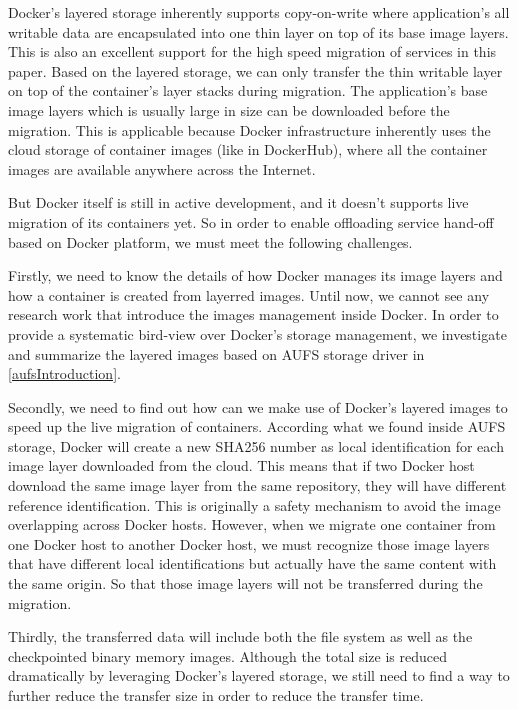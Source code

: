 Docker's layered storage inherently supports copy-on-write where application's all writable data are encapsulated into one thin layer on top of its base image layers. This is also an excellent support for the high speed migration of services in this paper. Based on the layered storage, we can only transfer the thin writable layer on top of the container's layer stacks during migration. The application's base image layers which is usually large in size can be downloaded before the migration. This is applicable because Docker infrastructure inherently uses the cloud storage of container images (like in DockerHub), where all the container images are available anywhere across the Internet. 

But Docker itself is still in active development, and it doesn't supports live migration of its containers yet. So in order to enable offloading service hand-off based on Docker platform, we must meet the following challenges.

Firstly, we need to know the details of how Docker manages its image layers and how a container is created from layerred images. Until now, we cannot see any research work that introduce the images management inside Docker. In order to provide a systematic bird-view over Docker's storage management, we investigate and summarize the layered images based on AUFS storage driver in \ref{aufsIntroduction}.

Secondly, we need to find out how can we make use of Docker's layered images to speed up the live migration of containers. According what we found inside AUFS storage, Docker will create a new SHA256 number as local  identification for each image layer downloaded from the cloud. 
This means that if two Docker host download the same image layer from the same repository, they will have different reference identification. This is originally a safety mechanism to avoid the image overlapping across Docker hosts\cite{dockerlayer}. 
However, when we migrate one container from one Docker host to another Docker host, we must recognize those image layers that have different local identifications but actually have the same content with the same origin. So that those image layers will not be transferred during the migration.

Thirdly, the transferred data will include both the file system as well as the checkpointed binary memory images. Although the total size is reduced dramatically by leveraging Docker's layered storage, we still need to find a way to further reduce the transfer size in order to reduce the transfer time. 

